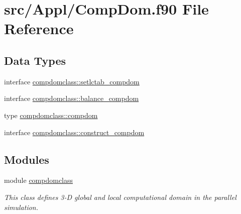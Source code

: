 \hypertarget{_comp_dom_8f90}{}\section{src/\+Appl/\+Comp\+Dom.f90 File Reference}
\label{_comp_dom_8f90}
\subsection*{Data Types}
\begin{DoxyCompactItemize}
\item 
interface \mbox{\hyperlink{interfacecompdomclass_1_1setlctab__compdom}{compdomclass\+::setlctab\+\_\+compdom}}
\item 
interface \mbox{\hyperlink{interfacecompdomclass_1_1balance__compdom}{compdomclass\+::balance\+\_\+compdom}}
\item 
type \mbox{\hyperlink{namespacecompdomclass_structcompdomclass_1_1compdom}{compdomclass\+::compdom}}
\item 
interface \mbox{\hyperlink{interfacecompdomclass_1_1construct__compdom}{compdomclass\+::construct\+\_\+compdom}}
\end{DoxyCompactItemize}
\subsection*{Modules}
\begin{DoxyCompactItemize}
\item 
module \mbox{\hyperlink{namespacecompdomclass}{compdomclass}}
\begin{DoxyCompactList}\small\item\em This class defines 3-\/D global and local computational domain in the parallel simulation. \end{DoxyCompactList}\end{DoxyCompactItemize}
